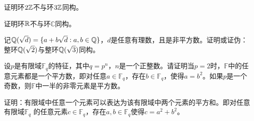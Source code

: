 \begin{problemset}
  \item 证明环$2{\mathbb Z}$不与环$3{\mathbb Z}$同构。%
  
  \item 证明环${\mathbb R}$不与环$\mathbb{C}$同构。%
  
  \item 记${\mathbb Q}(\sqrt{d})  = \{a + b \sqrt{d}: a, b \in {\mathbb Q}\}$，$d$是任意有理数，且是非平方数。证明或证伪：整环${\mathbb Q}(\sqrt{2}) $与整环${\mathbb Q}(\sqrt{3})$同构。 
  
 \item 设$p$是有限域$\mathbb{F}_q$的特征，其中$q=p^n$，$n$是一个正整数。请证明当$p=2$时，$\mathbb{F}$中的任意元素都是一个平方数，即对任意$a\in \mathbb{F}_q$，存在$b\in \mathbb{F}_q$，使得$a = b^2$。如果$p$是一个奇数，则$\mathbb{F}$中一半的非零元素是平方数。%
 
 \item  证明：有限域中任意一个元素可以表达为该有限域中两个元素的平方和。即对任意有限域$\mathbb{F}_q$ 的任意元素$c\in \mathbb{F}_q$，存在$a, b \in \mathbb{F}_q$使得$c = a^2 + b^2$。
  \end{problemset}
